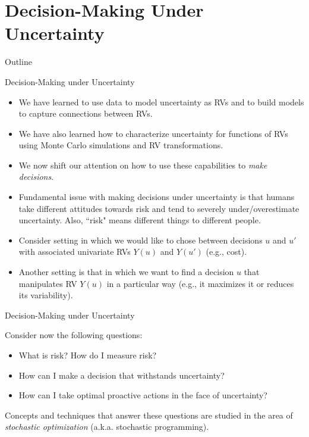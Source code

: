 \documentclass[9pt]{beamer}
\begin{document}
\section{Decision-Making Under Uncertainty}
\begin{frame}{Outline}
\tableofcontents[currentsection]
\end{frame}

%
\begin{frame}{Decision-Making under Uncertainty}
\begin{itemize}

\item We have learned to use data to model uncertainty as RVs and to build models to capture connections between RVs. 
\item We have also learned how to characterize uncertainty for functions of RVs using Monte Carlo simulations and RV transformations. 

\item We now shift our attention on how to use these capabilities to {\em make decisions}. 

\item Fundamental issue with making decisions under uncertainty is that humans take different attitudes towards risk and tend to severely under/overestimate uncertainty. Also, ``risk" means different things to different people. 

\item Consider setting in which we would like to chose between decisions $u$ and $u'$ with associated univariate RVs $Y(u)$ and $Y(u')$ (e.g., cost). 

\item Another setting is that in which we want to find a decision $u$ that manipulates RV $Y(u)$ in a particular way (e.g., it maximizes it or reduces its variability). 

\end{itemize}

\end{frame}

%
\begin{frame}{Decision-Making under Uncertainty}

Consider now the following questions:

\begin{block}{}
\begin{itemize}
\item What is risk? How do I measure risk?
\item How can I make a decision that withstands uncertainty?
\item How can I take optimal proactive actions in the face of uncertainty?
\end{itemize}
\end{block}
Concepts and techniques that answer these questions are studied in the area of {\em stochastic optimization} (a.k.a. stochastic programming). 


\end{frame}
\end{document}
